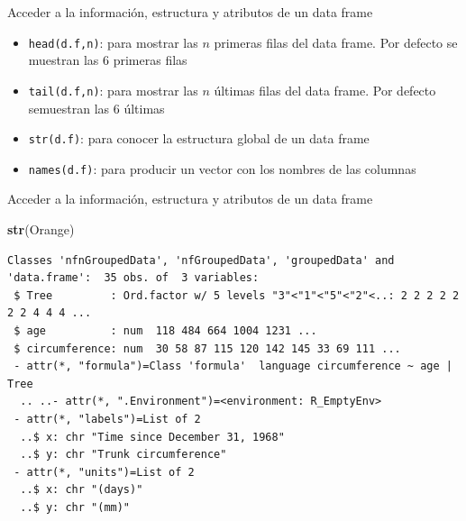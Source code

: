 \documentclass[
  ignorenonframetext,
  aspectratio=169]{beamer}
\newenvironment{Shaded}{\begin{snugshade}}{\end{snugshade}}
\newcommand{\FunctionTok}[1]{\textcolor[rgb]{0.13,0.29,0.53}{\textbf{#1}}}
\newcommand{\NormalTok}[1]{#1}
\providecommand{\tightlist}{%
  \setlength{\itemsep}{0pt}\setlength{\parskip}{0pt}}
\begin{document}
\begin{frame}[fragile]{Acceder a la información, estructura y atributos
de un data frame}
\label{acceder-a-la-informaciuxf3n-estructura-y-atributos-de-un-data-frame}
\begin{itemize}
\tightlist
\item
  \texttt{head(d.f,n)}: para mostrar las \(n\) primeras filas del data
  frame. Por defecto se muestran las 6 primeras filas
\item
  \texttt{tail(d.f,n)}: para mostrar las \(n\) últimas filas del data
  frame. Por defecto semuestran las 6 últimas
\item
  \texttt{str(d.f)}: para conocer la estructura global de un data frame
\item
  \texttt{names(d.f)}: para producir un vector con los nombres de las
  columnas
\end{itemize}
\end{frame}

\begin{frame}[fragile]{Acceder a la información, estructura y atributos
de un data frame}
\label{acceder-a-la-informaciuxf3n-estructura-y-atributos-de-un-data-frame-1}
\begin{Shaded}
\begin{Highlighting}[]
\FunctionTok{str}\NormalTok{(Orange)}
\end{Highlighting}
\end{Shaded}

\begin{verbatim}
Classes 'nfnGroupedData', 'nfGroupedData', 'groupedData' and 'data.frame':  35 obs. of  3 variables:
 $ Tree         : Ord.factor w/ 5 levels "3"<"1"<"5"<"2"<..: 2 2 2 2 2 2 2 4 4 4 ...
 $ age          : num  118 484 664 1004 1231 ...
 $ circumference: num  30 58 87 115 120 142 145 33 69 111 ...
 - attr(*, "formula")=Class 'formula'  language circumference ~ age | Tree
  .. ..- attr(*, ".Environment")=<environment: R_EmptyEnv> 
 - attr(*, "labels")=List of 2
  ..$ x: chr "Time since December 31, 1968"
  ..$ y: chr "Trunk circumference"
 - attr(*, "units")=List of 2
  ..$ x: chr "(days)"
  ..$ y: chr "(mm)"
\end{verbatim}
\end{frame}
\end{document}
